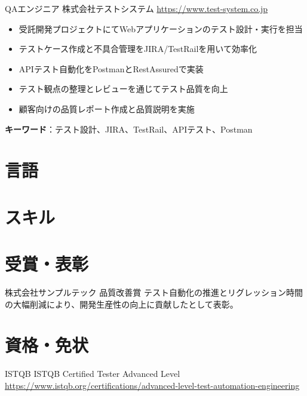 \documentclass[a4paper, serif, 10pt]{moderncv}
\begin{document}
        {QAエンジニア}
        {株式会社テストシステム}
        {\url{https://www.test-system.co.jp}}
        {}
        {\begin{itemize}
\item 受託開発プロジェクトにてWebアプリケーションのテスト設計・実行を担当
\item テストケース作成と不具合管理をJIRA/TestRailを用いて効率化
\item APIテスト自動化をPostmanとRestAssuredで実装
\item テスト観点の整理とレビューを通じてテスト品質を向上
\item 顧客向けの品質レポート作成と品質説明を実施
\end{itemize}
\textbf{キーワード}：テスト設計、JIRA、TestRail、APIテスト、Postman}
\section{言語}

\section{スキル}

\section{受賞・表彰}

        {株式会社サンプルテック}
        {品質改善賞}
        {}
        {}
        {テスト自動化の推進とリグレッション時間の大幅削減により、開発生産性の向上に貢献したとして表彰。}
\section{資格・免状}

        {ISTQB}
        {ISTQB Certified Tester Advanced Level}
        {\url{https://www.istqb.org/certifications/advanced-level-test-automation-engineering}}
        {}
        {}
\end{document}
